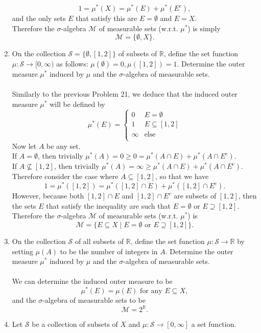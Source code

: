 \begin{enumerate}
	\[
		1=\mu^*(X)=\mu^*(E)+\mu^*(E^c),
	\]
	and the only sets $E$ that satisfy this are $E=\emptyset$ and $E=X$.
	\\Therefore the $\sigma$-algebra $\mathcal{M}$ of measurable sets (w.r.t. $\mu^*$) is simply
	\[
		\mathcal{M}=\{\emptyset,X\}.
	\]
	\item On the collection $\mathcal{S}=\{\emptyset,[1,2]\}$ of subsets of $\mathbb{R}$, define the set function $\mu:\mathcal{S}\to[0,\infty)$ as follows: $\mu(\emptyset)=0,\mu([1,2])=1$. 
	Determine the outer measure $\mu^*$ induced by $\mu$ and the $\sigma$-algebra of measurable sets.\\
	\\Similarly to the previous Problem 21, we deduce that the induced outer measure $\mu^*$ will be defined by
	\[
		\mu^*(E)=
		\begin{cases}
			0&E=\emptyset\\
			1&E\subseteq[1,2]\\
			\infty&\text{else}\\
		\end{cases}
	\]
	Now let $A$ be any set.
	\\If $A=\emptyset$, then trivially $\mu^*(A)=0\ge0=\mu^*(A\cap E)+\mu^*(A\cap E^c)$.
	\\If $A\not\subseteq[1,2]$, then trivially $\mu^*(A)=\infty\ge\mu^*(A\cap E)+\mu^*(A\cap E^c)$.
	\\Therefore consider the case where $A\subseteq[1,2]$, so that we have
	\[
		1=\mu^*([1,2])=\mu^*([1,2]\cap E)+\mu^*([1,2]\cap E^c).
	\]
	However, because both $[1,2]\cap E$ and $[1,2]\cap E^c$ are subsets of $[1,2]$, then the sets $E$ that satisfy the inequality are such that $E=\emptyset$ or $E\supseteq[1,2]$.
	\\Therefore the $\sigma$-algebra $\mathcal{M}$ of measurable sets (w.r.t. $\mu^*$) is
	\[
		\mathcal{M}=\{E\subseteq X\mid E=\emptyset\text{ or }E\supseteq[1,2]\}.
	\]
	\item On the collection $\mathcal{S}$ of all subsets of $\mathbb{R}$, define the set function $\mu:\mathcal{S}\to\mathbb{R}$ by setting $\mu(A)$ to be the number of integers in $A$.
	Determine the outer measure $\mu^*$ induced by $\mu$ and the $\sigma$-algebra of measurable sets.\\
	\\We can determine the induced outer measure to be
	\[
		\mu^*(E)=\mu(E)\text{ for any }E\subseteq X,
	\]
	and the $\sigma$-algebra of measurable sets to be
	\[
		\mathcal{M}=2^\mathbb{R}.
	\]
	\item Let $\mathcal{S}$ be a collection of subsets of $X$ and $\mu:\mathcal{S}\to[0,\infty]$ a set function.

\end{enumerate}
